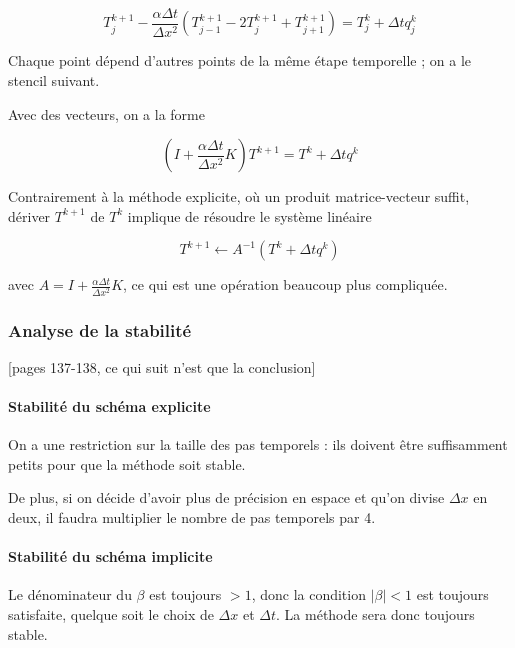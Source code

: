 		$$T^{k + 1}_j - \frac{\alpha \Delta t}{\Delta x^2} (T_{j - 1}^{k + 1} - 2 T^{k + 1}_j + T_{j + 1}^{k + 1}) = T_j^k + \Delta t q_j^k$$
		
		Chaque point dépend d'autres points de la même étape temporelle ; on a le stencil suivant.
		
		
		Avec des vecteurs, on a la forme
		
		$$(I + \frac{\alpha \Delta t}{\Delta x^2} K) T^{k + 1} = T^k + \Delta t q^k$$
		
		Contrairement à la méthode explicite, où un produit matrice-vecteur suffit, dériver $T^{k + 1}$ de $T^k$ implique de résoudre le système linéaire
		
		$$T^{k + 1} \leftarrow A^{-1}(T^k + \Delta t q^k)$$
		
		avec $A = I + \frac{\alpha \Delta t}{\Delta x^2} K$, ce qui est une opération beaucoup plus compliquée.
		
		
		
		\subsubsection{Analyse de la stabilité}
		
		[pages 137-138, ce qui suit n'est que la conclusion]
		
		
		\paragraph{Stabilité du schéma explicite}
		
		
		On a une restriction sur la taille des pas temporels : ils doivent être suffisamment petits pour que la méthode soit stable.
		
		De plus, si on décide d'avoir plus de précision en espace et qu'on divise $\Delta x$ en deux, il faudra multiplier le nombre de pas temporels par 4.
		
		\paragraph{Stabilité du schéma implicite}
		
		Le dénominateur du $\beta$ est toujours $> 1$, donc la condition $\vert \beta \vert < 1$ est toujours satisfaite, quelque soit le choix de $\Delta x$ et $\Delta t$. La méthode sera donc toujours stable.